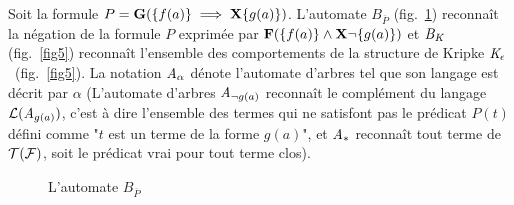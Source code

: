 \begin{example}
  Soit la formule $P = \mathbf G(\{f(a)\} \; \Longrightarrow \; \mathbf X \{g(a)\})$.
  L'automate $B_{\overline{P}}$ (fig.~\ref{fig4}) reconnaît la négation de la formule $P$
  exprimée par $\mathbf F(\{f(a)\} \land \mathbf X \neg\{g(a)\})$ et $\mathit B_\mathit K$ (fig.~\ref{fig5}) 
  reconnaît l'ensemble des comportements de la  structure de Kripke
  $\mathit K_\epsilon$~(fig.~\ref{fig5}). La notation $\mathit A_\alpha$ dénote l'automate d'arbres tel que son langage est décrit par $\alpha$
  (L'automate d'arbres $\mathit A_{\neg g(a)}$ reconnaît le complément du langage $\mathcal{L}{}(\mathit A_{g(a)})$,
  c'est à dire l'ensemble des termes qui ne satisfont pas le prédicat $P(t)$ défini comme
  "$t$ est un terme de la forme $g(a)$", et $\mathit A_*$ reconnaît tout terme de $\mathcal{T(F)}$, soit le prédicat vrai pour tout terme clos).
  \begin{figure}[ht!]
    \centering
    \caption{\footnotesize L'automate $B_{\overline{P}}$}
    \label{fig4}  
  \end{figure}
\end{example}


